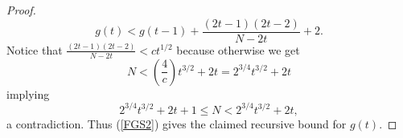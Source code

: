 \documentclass[12 pt]{article}
\begin{document}
{\begin{bibsection}[References]
\begin{biblist}[\normalsize]
\begin{proof}
\begin{equation}\label{FGS2}
g(t) < g(t-1) + \frac{(2t-1)(2t-2)}{N-2t} + 2.
\end{equation}
Notice  that $\frac{(2t-1)(2t-2)}{N-2t} < ct^{1/2}$ because otherwise we get 
\[N < (\frac{4}{c})t^{3/2}+2t= 2^{3/4}t^{3/2} + 2t \]
implying 
\[2^{3/4}t^{3/2} + 2t +1 \leq N < 2^{3/4}t^{3/2} + 2t, \]
a contradiction.  Thus (\ref{FGS2}) gives the claimed recursive bound for $g(t)$.
\end{proof}
\vskip 0.5cm 



\end{biblist}
\end{bibsection}}
\end{document}
